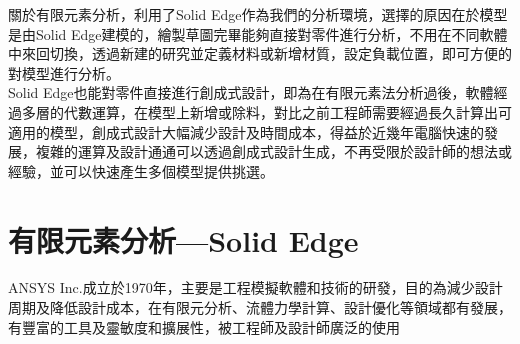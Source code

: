 關於有限元素分析，利用了Solid Edge作為我們的分析環境，選擇的原因在於模型是由Solid Edge建模的，繪製草圖完畢能夠直接對零件進行分析，不用在不同軟體中來回切換，透過新建的研究並定義材料或新增材質，設定負載位置，即可方便的對模型進行分析。\\

Solid Edge也能對零件直接進行創成式設計，即為在有限元素法分析過後，軟體經過多層的代數運算，在模型上新增或除料，對比之前工程師需要經過長久計算出可適用的模型，創成式設計大幅減少設計及時間成本，得益於近幾年電腦快速的發展，複雜的運算及設計通通可以透過創成式設計生成，不再受限於設計師的想法或經驗，並可以快速產生多個模型提供挑選。\\

\section{有限元素分析—Solid Edge}

ANSYS Inc.成立於1970年，主要是工程模擬軟體和技術的研發，目的為減少設計周期及降低設計成本，在有限元分析、流體力學計算、設計優化等領域都有發展，有豐富的工具及靈敏度和擴展性，被工程師及設計師廣泛的使用\\

\newpage
